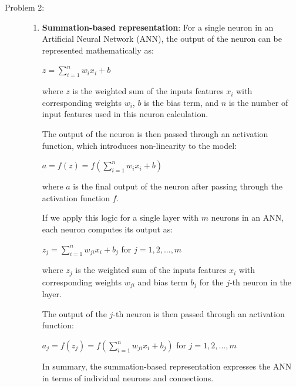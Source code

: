 \documentclass[12pt]{article}
\begin{document}
\begin{description}
  \pagebreak
  
  \item[Problem 2:] \hfill %

  \begin{enumerate}
    \item \textbf{Summation-based representation}:
    For a single neuron in an Artificial Neural Network (ANN), the output of the neuron can be represented mathematically as:

    \begin{center}
      $\displaystyle{z = \sum_{i=1}^{n} w_i x_i + b}$
    \end{center}

    where $z$ is the weighted sum of the inputs features $x_i$ with corresponding weights $w_i$, $b$ is the bias term, and $n$ is the number of input features 
    used in this neuron calculation.

    The output of the neuron is then passed through an activation function, which introduces non-linearity to the model:

    \begin{center}
      $\displaystyle{a = f(z) = f(\sum_{i=1}^{n} w_i x_i + b)}$
    \end{center}
    
    where $a$ is the final output of the neuron after passing through the activation function $f$.

    If we apply this logic for a single layer with $m$ neurons in an ANN, each neuron computes its output as:

    \begin{center}
      $\displaystyle{z_j = \sum_{i=1}^{n} w_{ji} x_i + b_j}$ for $j = 1, 2, ..., m$
    \end{center}

    where $z_j$ is the weighted sum of the inputs features $x_i$ with corresponding weights $w_{ji}$ and bias term $b_j$ for the $j$-th neuron in the layer.

    The output of the $j$-th neuron is then passed through an activation function:

    \begin{center}
      $\displaystyle{a_j = f(z_j) = f(\sum_{i=1}^{n} w_{ji} x_i + b_j)}$ for $j = 1, 2, ..., m$
    \end{center}

    In summary, the summation-based representation expresses the ANN in terms of individual neurons and connections. 


\end{enumerate}
\end{description}
\end{document}
